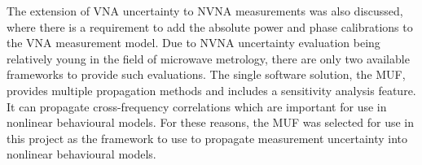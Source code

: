 \documentclass[../thesis/thesis.tex]{subfiles}
\begin{document}
\begin{refsection}
The extension of VNA uncertainty to NVNA measurements was also discussed, where there is a requirement to add the absolute power and phase calibrations to the VNA measurement model. Due to NVNA uncertainty evaluation being relatively young in the field of microwave metrology, there are only two available frameworks to provide such evaluations. The single software solution, the MUF, provides multiple propagation methods and includes a sensitivity analysis feature. It can propagate cross-frequency correlations which are important for use in nonlinear behavioural models. For these reasons, the MUF was selected for use in this project as the framework to use to propagate measurement uncertainty into nonlinear behavioural models.


\printbibliography[title=References]
\end{refsection}
\end{document}
